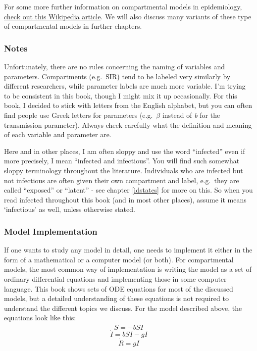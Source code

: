 \documentclass[
]{book}
\begin{document}
For some more further information on compartmental models in epidemiology, \href{https://en.wikipedia.org/wiki/Compartmental_models_in_epidemiology}{check out this Wikipedia article}. We will also discuss many variants of these type of compartmental models in further chapters.

\hypertarget{mynotebox}{%
\subsubsection{Notes}\label{mynotebox}}

Unfortunately, there are no rules concerning the naming of variables and parameters. Compartments (e.g.~SIR) tend to be labeled very similarly by different researchers, while parameter labels are much more variable. I'm trying to be consistent in this book, though I might mix it up occasionally. For this book, I decided to stick with letters from the English alphabet, but you can often find people use Greek letters for parameters (e.g.~\(\beta\) instead of \emph{b} for the transmission parameter). Always check carefully what the definition and meaning of each variable and parameter are.

Here and in other places, I am often sloppy and use the word ``infected'' even if more precisely, I mean ``infected and infectious''. You will find such somewhat sloppy terminology throughout the literature. Individuals who are infected but not infectious are often given their own compartment and label, e.g.~they are called ``exposed'' or ``latent'' - see chapter \ref{idstates} for more on this. So when you read infected throughout this book (and in most other places), assume it means `infectious' as well, unless otherwise stated.

\hypertarget{myadvancedbox}{%
\subsubsection{Model Implementation}\label{myadvancedbox}}

If one wants to study any model in detail, one needs to implement it either in the form of a mathematical or a computer model (or both). For compartmental models, the most common way of implementation is writing the model as a set of ordinary differential equations and implementing those in some computer language. This book shows sets of ODE equations for most of the discussed models, but a detailed understanding of these equations is not required to understand the different topics we discuss. For the model described above, the equations look like this:
\[\dot S = -bSI\]
\[\dot I = bSI - gI\]
\[\dot R = gI\]
\end{document}
